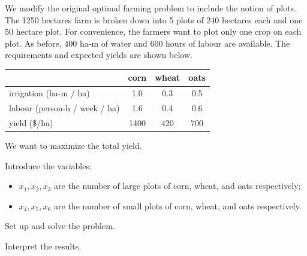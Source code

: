 \begin{slide}
\question

\begin{problem}
We modify the original optimal farming problem to include the notion of plots. The 1250 hectares farm is broken down into 5 plots of 240 hectares each and one 50 hectare plot. For convenience, the farmers want to plot only one crop on each plot. As before, 400 ha-m of water and 600 hours of labour are available. 
The requirements and expected yields are shown below.
	
	\begin{center}
	\small
	\begin{tabular}{l|c|c|c}
	& corn & wheat & oats \\ \hline
	irrigation (ha-m / ha) & 1.0 & 0.3 & 0.5 \\ \hline
	labour (person-h / week / ha) & 1.6 & 0.4 & 0.6 \\ \hline
	yield (\$/ha) & 1400 & 420 & 700 \\ %
	\end{tabular}
	\end{center}
	
	We want to maximize the total yield.
\end{problem}

Introduce the variables:
\begin{itemize}
	\item $x_1, x_2, x_3$ are the number of large plots of corn, wheat, and oats respectively;
	\item $x_4, x_5, x_6$ are the number of small plots of corn, wheat, and oats respectively.
\end{itemize}

\begin{parts}
	\item Set up and solve the problem.
	\item Interpret the results.
\end{parts}

	
\end{slide}


